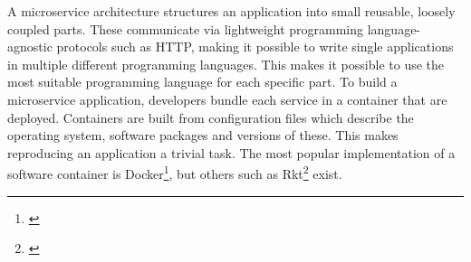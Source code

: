 A microservice architecture structures an application into small reusable,
loosely coupled parts. These communicate via lightweight programming
language-agnostic protocols such as HTTP, making it possible to write single
applications in multiple different programming languages. This makes it possible
to use the most suitable programming language for each specific part. To build a
microservice application, developers bundle each service in a container that are
deployed. Containers are built from configuration files which describe the
operating system, software packages and versions of these. This makes
reproducing an application a trivial task. The most popular implementation of a
software container is Docker\footnote{\url{}}, but others such as
Rkt\footnote{\url{}} exist.  




% 

